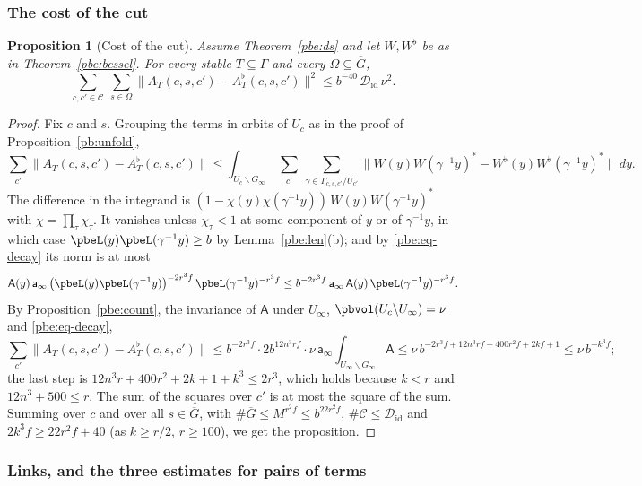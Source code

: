 \documentclass[10pt]{amsart}
\newtheorem{proposition}[theorem]{Proposition}
\theoremstyle{definition}
\theoremstyle{remark}
\providecommand{\auG}{\overline G}
\providecommand{\pbDid}{\mathcal D_{\mathrm{id}}}
\begin{document}
\subsubsection{The cost of the cut}\label{pbe:ss-cut}

\begin{proposition}[Cost of the cut]\label{pbe:cut}
Assume Theorem~\ref{pbe:ds} and let $W,W^\flat$ be as in Theorem~\ref{pbe:bessel}. For every stable
$T\subseteq\Gamma$ and every $\Omega\subseteq\auG$,
\[
\sum_{c,c'\in\mathcal C}\ \sum_{s\in\Omega}\bigl\|A_T(c,s,c')-A_T^\flat(c,s,c')\bigr\|^2\le b^{-40}\,
\pbDid\,\nu^2 .
\]
\end{proposition}
\begin{proof}
Fix $c$ and $s$. Grouping the terms in orbits of $U_c$ as in the proof of
Proposition~\ref{pb:unfold},
\[
\sum_{c'}\|A_T(c,s,c')-A_T^\flat(c,s,c')\|\le\int_{U_c\backslash G_\infty}\ \sum_{c'}\ \sum_{\gamma\in
\Gamma_{c,s,c'}/U_{c'}}\bigl\|W(y)W(\gamma^{-1}y)^*-W^\flat(y)W^\flat(\gamma^{-1}y)^*\bigr\|\,dy .
\]
The difference in the integrand is $(1-\chi(y)\chi(\gamma^{-1}y))\,W(y)W(\gamma^{-1}y)^*$ with $\chi=
\prod_\tau\chi_\tau$. It vanishes unless $\chi_\tau<1$ at some component of $y$ or of $\gamma^{-1}y$,
in which case $\pbeL(y)\pbeL(\gamma^{-1}y)\ge b$ by Lemma~\ref{pbe:len}(b); and by \eqref{pbe:eq-decay}
its norm is at most
\[
\mathsf A(y)\,\mathsf a_\infty\,\bigl(\pbeL(y)\pbeL(\gamma^{-1}y)\bigr)^{-2r^3f}\,\pbeL(\gamma^{-1}y)^{
-r^3f}\le b^{-2r^3f}\,\mathsf a_\infty\,\mathsf A(y)\,\pbeL(\gamma^{-1}y)^{-r^3f}.
\]
By Proposition~\ref{pbe:count}, the invariance of $\mathsf A$ under $U_\infty$, $\pbvol(U_c\backslash
U_\infty)=\nu$ and \eqref{pbe:eq-decay},
\[
\sum_{c'}\|A_T(c,s,c')-A_T^\flat(c,s,c')\|\le b^{-2r^3f}\cdot2b^{12n^3rf}\cdot\nu\,\mathsf a_\infty\int_{
U_\infty\backslash G_\infty}\mathsf A\le\nu\,b^{-2r^3f+12n^3rf+400r^2f+2kf+1}\le\nu\,b^{-k^3f};
\]
the last step is $12n^3r+400r^2+2k+1+k^3\le2r^3$, which holds because $k<r$ and $12n^3+500\le r$.
The sum of the squares over $c'$ is at most the square of the sum. Summing over $c$ and over all
$s\in\auG$, with $\#\auG\le M^{r^2f}\le b^{22r^2f}$, $\#\mathcal C\le\pbDid$ and $2k^3f\ge22r^2f+40$ (as
$k\ge r/2$, $r\ge100$), we get the proposition.
\end{proof}

\subsubsection{Links, and the three estimates for pairs of terms}\label{pbe:ss-pillars}
\end{document}

